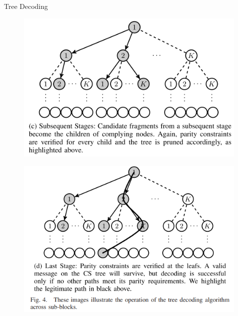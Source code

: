 \documentclass[aspectratio=169, handout, 10pt, hyperref=colorlinks]{beamer}
\begin{document}
\begin{frame}{Tree Decoding}
    \begin{figure}
        \centering
        \begin{minipage}[b]{0.4\linewidth}
            \centering
            \includegraphics[width=\linewidth]{images_CCS/fig4c.png}
            \label{fig:fig3}
        \end{minipage}
        \hfill
        \begin{minipage}[b]{0.4\linewidth}
            \centering
            \includegraphics[width=\linewidth]{images_CCS/fig4d.png}
            \label{fig:fig4}
        \end{minipage}
    \end{figure}
\end{frame}
\end{document}
